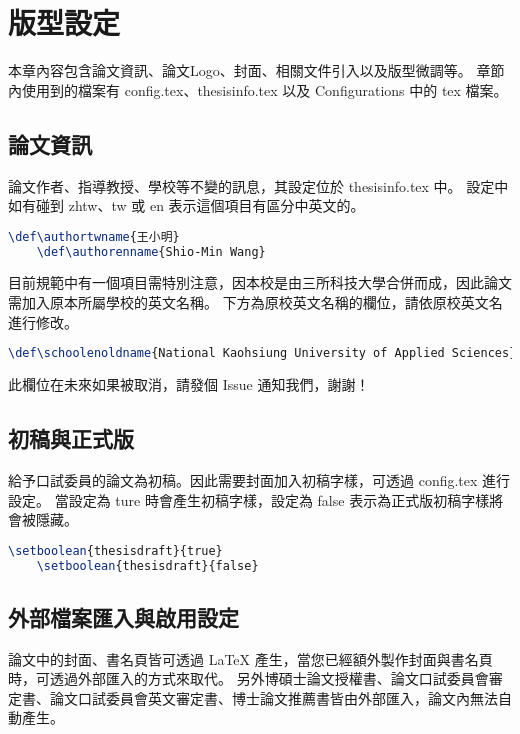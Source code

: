 \chapter{版型設定} \label{ch_tmp_config}

本章內容包含論文資訊、論文Logo、封面、相關文件引入以及版型微調等。
章節內使用到的檔案有 config.tex、thesisinfo.tex 以及 Configurations 中的 tex 檔案。

\section{論文資訊}

論文作者、指導教授、學校等不變的訊息，其設定位於 thesisinfo.tex 中。
設定中如有碰到 zhtw、tw 或 en 表示這個項目有區分中英文的。

\begin{lstlisting}[language=TeX]
    \def\authortwname{王小明}
    \def\authorenname{Shio-Min Wang}
\end{lstlisting}

目前規範中有一個項目需特別注意，因本校是由三所科技大學合併而成，因此論文需加入原本所屬學校的英文名稱。
下方為原校英文名稱的欄位，請依原校英文名進行修改。

\begin{lstlisting}[language=TeX]
    \def\schoolenoldname{National Kaohsiung University of Applied Sciences}
\end{lstlisting}

此欄位在未來如果被取消，請發個 Issue 通知我們，謝謝！

\section{初稿與正式版}

給予口試委員的論文為初稿。因此需要封面加入初稿字樣，可透過 config.tex 進行設定。
當設定為 ture 時會產生初稿字樣，設定為 false 表示為正式版初稿字樣將會被隱藏。

\begin{lstlisting}[language=TeX]
    \setboolean{thesisdraft}{true}
    \setboolean{thesisdraft}{false}
\end{lstlisting}

\section{外部檔案匯入與啟用設定}

論文中的封面、書名頁皆可透過 LaTeX 產生，當您已經額外製作封面與書名頁時，可透過外部匯入的方式來取代。
另外博碩士論文授權書、論文口試委員會審定書、論文口試委員會英文審定書、博士論文推薦書皆由外部匯入，論文內無法自動產生。

